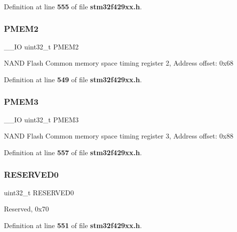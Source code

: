 Definition at line \textbf{ 555} of file \textbf{ stm32f429xx.\+h}.

\mbox{\label{structFMC__Bank2__3__TypeDef_a2e5a7a96de68a6612affa6df8c309c3d}} 
\subsubsection{P\+M\+E\+M2}
{\footnotesize\ttfamily \+\_\+\+\_\+\+IO uint32\+\_\+t P\+M\+E\+M2}

N\+A\+ND Flash Common memory space timing register 2, Address offset\+: 0x68 

Definition at line \textbf{ 549} of file \textbf{ stm32f429xx.\+h}.

\mbox{\label{structFMC__Bank2__3__TypeDef_aba8981e4f06cfb3db7d9959242052f80}} 
\subsubsection{P\+M\+E\+M3}
{\footnotesize\ttfamily \+\_\+\+\_\+\+IO uint32\+\_\+t P\+M\+E\+M3}

N\+A\+ND Flash Common memory space timing register 3, Address offset\+: 0x88 

Definition at line \textbf{ 557} of file \textbf{ stm32f429xx.\+h}.

\mbox{\label{structFMC__Bank2__3__TypeDef_af86c61a5d38a4fc9cef942a12744486b}} 
\subsubsection{R\+E\+S\+E\+R\+V\+E\+D0}
{\footnotesize\ttfamily uint32\+\_\+t R\+E\+S\+E\+R\+V\+E\+D0}

Reserved, 0x70 

Definition at line \textbf{ 551} of file \textbf{ stm32f429xx.\+h}.

